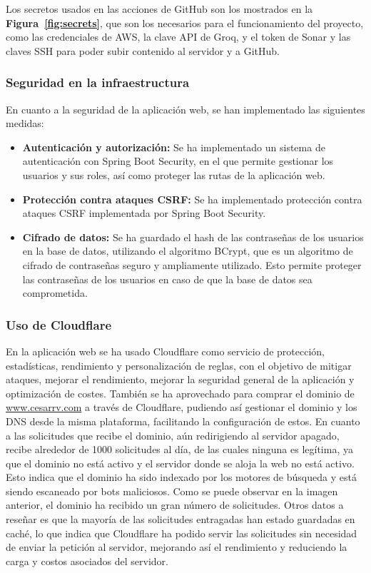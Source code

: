Los secretos usados en las acciones de GitHub son los mostrados en la \textbf{Figura~\ref{fig:secrets}}, que son los necesarios para el funcionamiento del proyecto, como las credenciales de AWS, la clave API de Groq, y el token de Sonar y las claves SSH para poder subir contenido al servidor y a GitHub.

\subsubsection{Seguridad en la infraestructura}

En cuanto a la seguridad de la aplicación web, se han implementado las siguientes medidas:
\begin{itemize}
    \item \textbf{Autenticación y autorización:} Se ha implementado un sistema de autenticación con Spring Boot Security, en el que permite gestionar los usuarios y sus roles, así como proteger las rutas de la aplicación web.
    \item \textbf{Protección contra ataques CSRF:} Se ha implementado protección contra ataques CSRF implementada por Spring Boot Security.
    \item \textbf{Cifrado de datos:} Se ha guardado el hash de las contraseñas de los usuarios en la base de datos, utilizando el algoritmo BCrypt, que es un algoritmo de cifrado de contraseñas seguro y ampliamente utilizado. Esto permite proteger las contraseñas de los usuarios en caso de que la base de datos sea comprometida.
\end{itemize}


\subsubsection{Uso de Cloudflare}
En la aplicación web se ha usado Cloudflare como servicio de protección, estadísticas, rendimiento y personalización de reglas, con el objetivo de mitigar ataques, mejorar el rendimiento, mejorar la seguridad general de la aplicación y optimización de costes.
También se ha aprovechado para comprar el dominio de \url{www.cesarrv.com} a través de Cloudflare, pudiendo así gestionar el dominio y los DNS desde la misma plataforma, facilitando la configuración de estos.
En cuanto a las solicitudes que recibe el dominio, aún redirigiendo al servidor apagado, recibe alrededor de 1000 solicitudes al día, de las cuales ninguna es legítima, ya que el dominio no está activo y el servidor donde se aloja la web no está activo. Esto indica que el dominio ha sido indexado por los motores de búsqueda y está siendo escaneado por bots maliciosos.
Como se puede observar en la imagen anterior, el dominio ha recibido un gran número de solicitudes. Otros datos a reseñar es que la mayoría de las solicitudes entragadas han estado guardadas en caché, lo que indica que Cloudflare ha podido servir las solicitudes sin necesidad de enviar la petición al servidor, mejorando así el rendimiento y reduciendo la carga y costos asociados del servidor.

